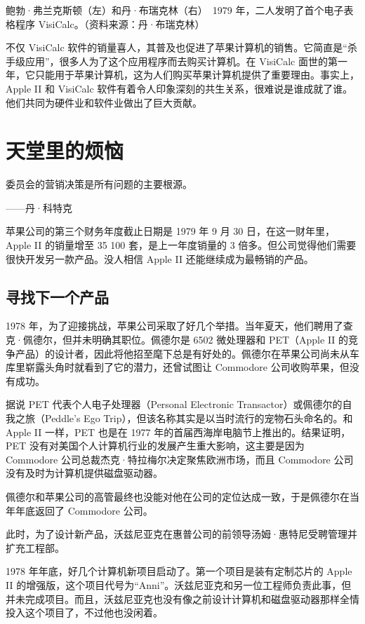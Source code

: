\documentclass[12pt,UTF8]{ctexbook}
\begin{document}
鲍勃·弗兰克斯顿（左）和丹·布瑞克林（右）　1979 年，二人发明了首个电子表格程序 VisiCalc。（资料来源：丹·布瑞克林）

不仅 VisiCalc 软件的销量喜人，其普及也促进了苹果计算机的销售。它简直是“杀手级应用”，很多人为了这个应用程序而去购买计算机。在 VisiCalc 面世的第一年，它只能用于苹果计算机，这为人们购买苹果计算机提供了重要理由。事实上，Apple II 和 VisiCalc 软件有着令人印象深刻的共生关系，很难说是谁成就了谁。他们共同为硬件业和软件业做出了巨大贡献。





\section{天堂里的烦恼}


委员会的营销决策是所有问题的主要根源。

——丹·科特克



苹果公司的第三个财务年度截止日期是 1979 年 9 月 30 日，在这一财年里，Apple II 的销量增至 35 100 套，是上一年度销量的 3 倍多。但公司觉得他们需要很快开发另一款产品。没人相信 Apple II 还能继续成为最畅销的产品。





\subsection{寻找下一个产品}


1978 年，为了迎接挑战，苹果公司采取了好几个举措。当年夏天，他们聘用了查克·佩德尔，但并未明确其职位。佩德尔是 6502 微处理器和 PET（Apple II 的竞争产品）的设计者，因此将他招至麾下总是有好处的。佩德尔在苹果公司尚未从车库里崭露头角时就看到了它的潜力，还曾试图让 Commodore 公司收购苹果，但没有成功。

据说 PET 代表个人电子处理器（Personal Electronic Transactor）或佩德尔的自我之旅（Peddle's Ego Trip），但该名称其实是以当时流行的宠物石头命名的。和 Apple II 一样，PET 也是在 1977 年的首届西海岸电脑节上推出的。结果证明，PET 没有对美国个人计算机行业的发展产生重大影响，这主要是因为 Commodore 公司总裁杰克·特拉梅尔决定聚焦欧洲市场，而且 Commodore 公司没有及时为计算机提供磁盘驱动器。

佩德尔和苹果公司的高管最终也没能对他在公司的定位达成一致，于是佩德尔在当年年底返回了 Commodore 公司。

此时，为了设计新产品，沃兹尼亚克在惠普公司的前领导汤姆·惠特尼受聘管理并扩充工程部。

1978 年年底，好几个计算机新项目启动了。第一个项目是装有定制芯片的 Apple II 的增强版，这个项目代号为“Anni”。沃兹尼亚克和另一位工程师负责此事，但并未完成项目。而且，沃兹尼亚克也没有像之前设计计算机和磁盘驱动器那样全情投入这个项目了，不过他也没闲着。
\end{document}
